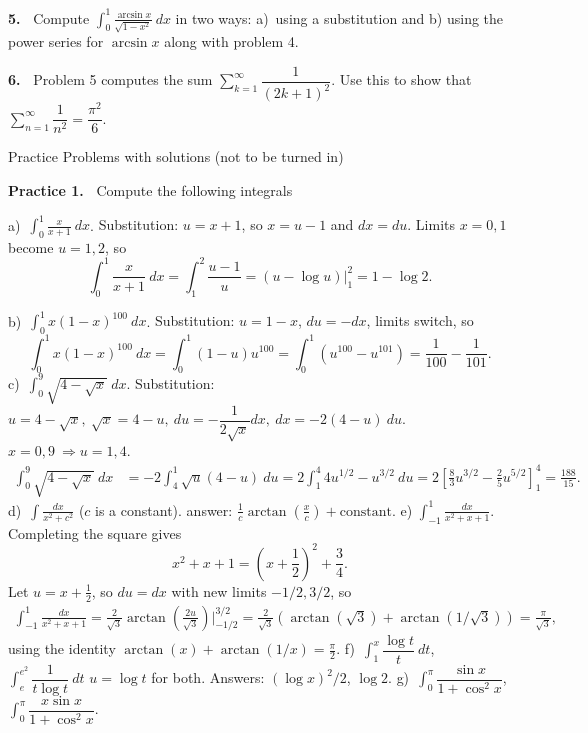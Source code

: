 \documentclass[12pt]{article}
\theoremstyle{definition}
\theoremstyle{remark}
\theoremstyle{definition}
\begin{document}
{\bf 5.\ } Compute 
$\displaystyle \int_0^1\frac{\arcsin x}{\sqrt{1-x^2}}\ dx$ in two ways:
a)\ using a substitution and b) using the power series for $\arcsin x$ along with problem 4.  

{\bf 6.\ } Problem 5 computes the sum 
$\sum\limits_{k=1}^\infty\dfrac{1}{(2k+1)^2}$. Use this to show that 
$\sum\limits_{n=1}^\infty\dfrac{1}{n^2}=\dfrac{\pi^2}{6}.$


\newpage
Practice Problems with solutions (not to be turned in)

{\bf Practice 1.\ }  Compute the following integrals

a)\ $\displaystyle\int_0^1\frac{x}{x+1}\ dx$.
\vskip10pt
{\small Substitution: $u=x+1$, so $x=u-1$ and $dx=du$. Limits $x=0,1$ become $u=1,2$, so 
\[\int_0^1\frac{x}{x+1}\ dx=\int_1^2\frac{u-1}{u}=(u-\log u)\Big\vert_1^2=1-\log 2.\]
}

b)\  $\displaystyle\int_0^1x(1-x)^{100}\ dx$.
\vskip10pt
{\small Substitution: $u=1-x$, $du=-dx$, limits switch, so 
\[\int_0^1x(1-x)^{100}\ dx=\int_0^1(1-u)u^{100}=\int_0^1(u^{100}-u^{101})=\frac{1}{100}-\frac{1}{101}.\]
}
c)\ $\displaystyle\int_0^9\sqrt{4-\sqrt{x}}\ dx$. 
\vskip10pt
{\small 
Substitution: $u=4-\sqrt{x},\ \sqrt{x}=4-u,\ du=-\dfrac{1}{2\sqrt{x}} dx,\ dx=-2(4-u)\ du$. $x=0,9\ \Rightarrow u=1,4$. \[\begin{split}\int_0^9\sqrt{4-\sqrt{x}}\ dx
&= -2\int_4^1\sqrt{u}(4-u)\ du=2\int_1^4 4u^{1/2}-u^{3/2}\ du=
2\left[\frac{8}{3}u^{3/2}-\frac{2}{5}u^{5/2}\right]_1^4
=\frac{188}{15}.
\end{split}
\]
}
\vskip10pt
d)\ $\displaystyle\int \frac{dx}{x^2+c^2}$ \quad ($c$ is a constant). 
\vskip10pt
{\small answer: $\frac{1}{c}\arctan\left(\frac{x}{c}\right)+\text{constant}$.
}
\vskip10pt
e) $\displaystyle\int_{-1}^1\frac{dx}{x^2+x+1}$.
\vskip10pt
{\small 
Completing the square gives 
\[x^2+x+1=\left(x+\frac{1}{2}\right)^2+\frac{3}{4}.\]
Let $u=x+\frac{1}{2}$, so $du=dx$ with new limits $-1/2, 3/2$, so 
\[\begin{split}
\int_{-1}^1\frac{dx}{x^2+x+1}
=\frac{2}{\sqrt{3}}
\arctan\left(\frac{2u}{\sqrt{3}}\right)\Big\vert_{-1/2}^{3/2}
=\frac{2}{\sqrt{3}}\left(\arctan(\sqrt{3})+\arctan(1/\sqrt{3})\right)
=\frac{\pi}{\sqrt{3}},
\end{split}
\]
using the identity $\arctan(x)+\arctan(1/x)=\frac{\pi}{2}$. }
\vskip10pt
f)\ $\displaystyle\int_{1}^x\dfrac{\log t}{t}\ dt$, \qquad
$\displaystyle\int_{e}^{e^2}\dfrac{1}{t\log t}\ dt$\qquad
{\small $u=\log t$ for both. Answers: $(\log x)^2/2$, \quad $\log 2$. }
\vskip10pt
g)\ $\displaystyle\int_{0}^\pi\dfrac{\sin x}{1+\cos^2 x}$,\qquad 
$\displaystyle\int_{0}^\pi\dfrac{x\sin x}{1+\cos^2 x}$.
\end{document}
